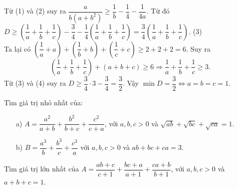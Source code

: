 \begin{bt}
{\begin{itemize}
			Từ (1) và (2) suy ra $\dfrac{a}{b(a+b^2)}\geq \dfrac{1}{b}-\dfrac{1}{4}-\dfrac{1}{4a}$. Từ đó\\
			$D\geq \left(\dfrac{1}{a}+\dfrac{1}{b}+\dfrac{1}{c}\right)-\dfrac{3}{4}-\dfrac{1}{4}\left( \dfrac{1}{a}+\dfrac{1}{b}+\dfrac{1}{c}\right)=\dfrac{3}{4}\left( \dfrac{1}{a}+\dfrac{1}{b}+\dfrac{1}{c}\right).$ \hfill (3)\\
			Ta lại có $\left( \dfrac{1}{a}+a\right)+\left(\dfrac{1}{b}+b\right)+\left(\dfrac{1}{c}+c\right)\geq 2+2+2=6$. Suy ra
			\[\left(\dfrac{1}{a}+\dfrac{1}{b}+\dfrac{1}{c}\right)+(a+b+c)\geq 6 \Rightarrow \dfrac{1}{a}+\dfrac{1}{b}+\dfrac{1}{c}\geq 3. \tag{4}\]
			Từ (3) và (4) suy ra $D\geq \dfrac{3}{4}\cdot 3-\dfrac{3}{4}=\dfrac{3}{2}$. Vậy $\min D=\dfrac{3}{2} \Leftrightarrow a=b=c=1$.
		\end{itemize}           
	}
\end{bt}
\begin{bt}
	Tìm giá trị nhỏ nhất của: 
	\begin{itemize}
		\item [a)] $A=\dfrac{a^2}{a+b}+\dfrac{b^2}{b+c}+\dfrac{c^2}{c+a}$, với $a, b, c>0$ và $\sqrt{ab}+\sqrt{bc}+\sqrt{ca}=1$.
		\item [b)] $B=\dfrac{a^3}{b}+\dfrac{b^3}{c}+\dfrac{c^3}{a}$ với $a, b, c>0$ và $ab+bc+ca=3$.
	\end{itemize}
\end{bt}
\begin{bt}
	Tìm giá trị lớn nhất của
	$A=\dfrac{ab+c}{c+1}+\dfrac{bc+a}{a+1}+\dfrac{ca+b}{b+1}$, với $a,b,c>0$ và $a+b+c=1$.
\end{bt}
